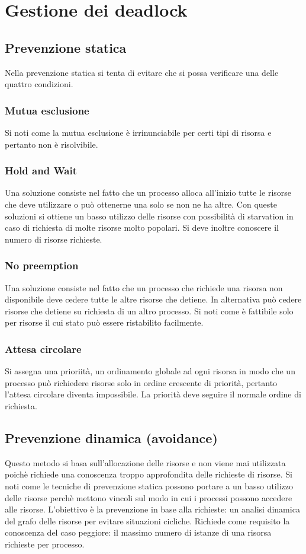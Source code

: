 \section{Gestione dei deadlock}
\subsection{Prevenzione statica}
Nella prevenzione statica si tenta di evitare che si possa verificare una delle quattro condizioni. 
\subsubsection{Mutua esclusione}
Si noti come la mutua esclusione \`e irrinunciabile per certi tipi di risorsa e pertanto non \`e risolvibile.
\subsubsection{Hold and Wait}
Una soluzione consiste nel fatto che un processo alloca all'inizio tutte le risorse che deve utilizzare o pu\`o ottenerne una solo se non ne ha altre. Con queste soluzioni si ottiene
un basso utilizzo delle risorse con possibilit\`a di starvation in caso di richiesta di molte risorse molto popolari. Si deve inoltre conoscere il numero di risorse richieste. 
\subsubsection{No preemption}
Una soluzione consiste nel fatto che un processo che richiede una risorsa non disponibile deve cedere tutte le altre risorse che detiene. In alternativa pu\`o cedere risorse che 
detiene su richiesta di un altro processo. Si noti come \`e fattibile solo per risorse il cui stato pu\`o essere ristabilito facilmente. 
\subsubsection{Attesa circolare}
Si assegna una prioriit\`a, un ordinamento globale ad ogni risorsa in modo che un processo pu\`o richiedere risorse solo in ordine crescente di priorit\`a, pertanto l'attesa circolare
diventa impossibile. La priorit\`a deve seguire il normale ordine di richiesta. 
\subsection{Prevenzione dinamica (avoidance)}
Questo metodo si basa sull'allocazione delle risorse e non viene mai utilizzata poich\`e richiede una conoscenza troppo approfondita delle richieste di risorse. Si noti come le 
tecniche di prevenzione statica possono portare a un basso utilizzo delle risorse perch\`e mettono vincoli sul modo in cui i processi possono accedere alle risorse. L'obiettivo \`e la
prevenzione in base alla richieste: un analisi dinamica del grafo delle risorse per evitare situazioni cicliche. Richiede come requisito la conoscenza del caso peggiore: il massimo 
numero di istanze di una risorsa richieste per processo. 
